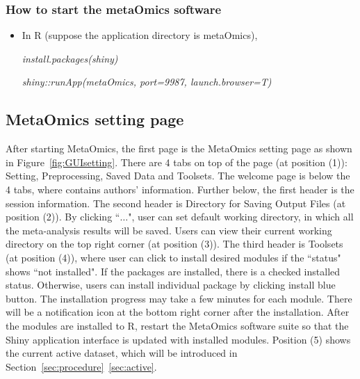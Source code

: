 \subsubsection{How to start the metaOmics software}
\begin{itemize}
\item In R (suppose the application directory is metaOmics),

\textit{install.packages(\textquotesingle shiny\textquotesingle)}

\textit{shiny::runApp(\textquotesingle metaOmics\textquotesingle, port=9987, launch.browser=T)}
\end{itemize}

\subsection{MetaOmics setting page}
\label{sec:setting}
After starting MetaOmics, 
the first page is the MetaOmics setting page as shown in Figure~\ref{fig:GUIsetting}.  
There are 4 tabs on top of the page (at position {\color{red} (1)}): Setting, Preprocessing, Saved Data and Toolsets.
The welcome page is below the 4 tabs, where contains authors' information.
Further below, the first header is the session information.
The second header is Directory for Saving Output Files (at position {\color{red} (2)}).
By clicking ``$\ldots$",
user can set default working directory, in which all the meta-analysis results will be saved.
Users can view their current working directory on the top right corner (at position {\color{red} (3)}).
The third header is Toolsets (at position {\color{red} (4)}),
where user can click to install desired modules if the ``status" shows ``not installed".
If the packages are installed, there is a checked installed status.
Otherwise, users can install individual package by clicking install blue button.
The installation progress may take a few minutes for each module.
There will be a notification icon at the bottom right corner after the installation. 
After the modules are installed to R, restart the MetaOmics software suite so that the Shiny application interface is updated with installed modules.
Position {\color{red} (5)} shows the current active dataset, which will be introduced in Section~\ref{sec:procedure}~\ref{sec:active}. 
 
